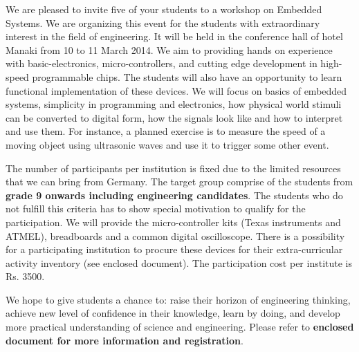 \documentclass[11pt,stdletter,dateno,sigleft]{newlfm} %
\begin{document}
\begin{newlfm}

We are pleased to invite five of your students to a workshop on Embedded Systems. We are organizing this event for the students with extraordinary interest in the field of engineering. It will be held in the conference hall of hotel Manaki from 10 to 11 March 2014. We aim to providing hands on experience with basic-electronics, micro-controllers, and cutting edge development in high-speed programmable chips. The students will also have an opportunity to learn functional implementation of these devices. We will focus on basics of embedded systems, simplicity in programming and electronics, how physical world stimuli can be converted to digital form, how the signals look like and how to interpret and use them. For instance, a planned exercise is to measure the speed of a moving object using ultrasonic waves and use it to trigger some other event.
 
The number of participants per institution is fixed due to the limited resources that we can bring from Germany. The target group comprise of the students from \textbf{grade 9 onwards including engineering candidates}. The students who do not fulfill this criteria has to show special motivation to qualify for the participation. We will provide the micro-controller kits (Texas instruments and ATMEL), breadboards  and a common digital oscilloscope. There is a possibility for a participating institution to procure these devices for their extra-curricular activity inventory (see enclosed document). The participation cost per institute is Rs. 3500. 

We hope to give students a chance to: raise their horizon of engineering thinking, achieve new level of confidence in their knowledge, learn by doing, and develop more practical understanding of science and engineering. Please refer to \textbf{enclosed document for more information and registration}.\\[5pt]
\end{newlfm}
\end{document}
